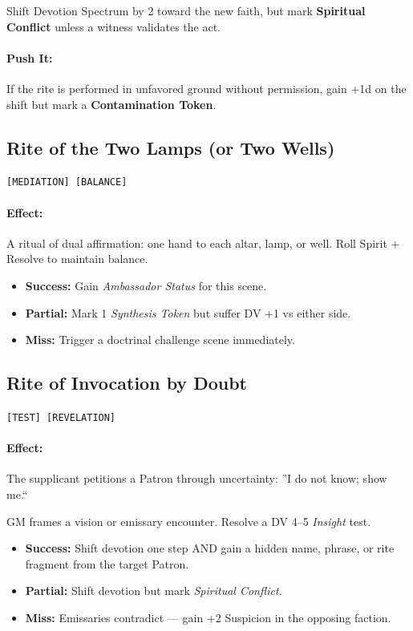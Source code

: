 \documentclass[11pt]{article}
\begin{document}
Shift Devotion Spectrum by 2 toward the new faith,
but mark \textbf{Spiritual Conflict} unless a witness validates the act.

\paragraph{Push It:}
If the rite is performed in unfavored ground without permission,
gain +1d on the shift but mark a \textbf{Contamination Token}.

\subsection*{Rite of the Two Lamps (or Two Wells)}
 \quad \texttt{[MEDIATION] [BALANCE]}

\paragraph{Effect:}
A ritual of dual affirmation: one hand to each altar, lamp, or well.
Roll Spirit + Resolve to maintain balance.
\begin{itemize}
  \item \textbf{Success:} Gain \emph{Ambassador Status} for this scene.
  \item \textbf{Partial:} Mark 1 \emph{Synthesis Token} but suffer DV +1 vs either side.
  \item \textbf{Miss:} Trigger a doctrinal challenge scene immediately.
\end{itemize}

\subsection*{Rite of Invocation by Doubt}
 \quad \texttt{[TEST] [REVELATION]}

\paragraph{Effect:}
The supplicant petitions a Patron through uncertainty:
''I do not know; show me.``

GM frames a vision or emissary encounter.
Resolve a DV 4--5 \emph{Insight} test.

\begin{itemize}
  \item \textbf{Success:} Shift devotion one step AND gain a hidden name,
        phrase, or rite fragment from the target Patron.
  \item \textbf{Partial:} Shift devotion but mark \emph{Spiritual Conflict}.
  \item \textbf{Miss:} Emissaries contradict --- gain +2 Suspicion in the opposing faction.
\end{itemize}
\end{document}
